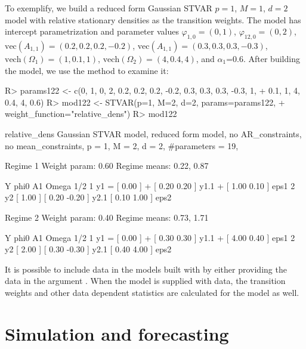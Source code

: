 \documentclass[nojss]{jss}
\begin{document}
To exemplify, we build a reduced form Gaussian STVAR $p=1$, $M=1$, $d=2$ model with relative stationary densities as the transition weights. The model has intercept parametrization and parameter values $\varphi_{1,0}=(0, 1)$, $\varphi_{12,0}=(0, 2)$, $\text{vec}(A_{1,1}) = (0.2, 0.2, 0.2, -0.2)$, $\text{vec}(A_{1,1}) = (0.3, 0.3, 0.3, -0.3)$, $\text{vech}(\Omega_1) = (1, 0.1, 1)$, $\text{vech}(\Omega_2) = (4, 0.4, 4)$, and $\alpha_1$=0.6. After building the model, we use the  method to examine it:
%
\begin{CodeChunk}
\begin{CodeInput}
R> params122 <- c(0, 1, 0, 2, 0.2, 0.2, 0.2, -0.2, 0.3, 0.3, 0.3, -0.3, 1,
+    0.1, 1, 4, 0.4, 4, 0.6)
R> mod122 <- STVAR(p=1, M=2, d=2, params=params122,
+    weight_function="relative_dens")
R> mod122
\end{CodeInput}
\begin{CodeOutput}
relative_dens Gaussian STVAR model, reduced form model, no AR_constraints,
no mean_constraints,
  p = 1, M = 2, d = 2, #parameters = 19,

Regime 1
Weight param: 0.60
Regime means: 0.22, 0.87

   Y     phi0          A1                  Omega        1/2
1 y1 = [ 0.00 ] + [  0.20  0.20 ] y1.1 + [  1.00 0.10 ]     eps1
2 y2   [ 1.00 ]   [  0.20 -0.20 ] y2.1   [  0.10 1.00 ]     eps2

Regime 2
Weight param: 0.40
Regime means: 0.73, 1.71

   Y     phi0          A1                  Omega        1/2
1 y1 = [ 0.00 ] + [  0.30  0.30 ] y1.1 + [  4.00 0.40 ]     eps1
2 y2   [ 2.00 ]   [  0.30 -0.30 ] y2.1   [  0.40 4.00 ]     eps2
\end{CodeOutput}
\end{CodeChunk}
%

It is possible to include data in the models built with  by either providing the data in the argument . When the model is supplied with data, the transition weights and other data dependent statistics are calculated for the model as well.

\section{Simulation and forecasting}\label{sec:simufore}
\end{document}
